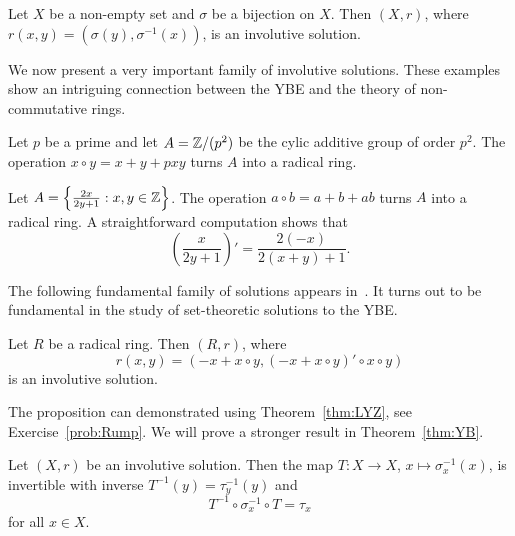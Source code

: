 \begin{example}
Let $X$ be a non-empty set and $\sigma$ be a bijection on $X$. Then 
$(X,r)$, where $r(x,y)=(\sigma(y),\sigma^{-1}(x))$, is an involutive solution. 
\end{example}

We now present a very important family of involutive solutions. 
These examples show an intriguing connection between the YBE and the 
theory of non-commutative rings. 




\begin{example}
Let $p$ be a prime and let $A=\mathbb{Z}/(p^2)$ be the cylic additive group of order $p^2$. 
The operation $x\circ y=x+y+pxy$ 
turns $A$ into a radical ring. 
\end{example}

\begin{example}
Let $A=\left\{\frac{2x}{2y+1}:x,y\in\mathbb{Z}\right\}$. The operation 
$a\circ b=a+b+ab$ turns $A$ into a radical ring. A straightforward computation shows that 
\[
\left(\frac{x}{2y+1}\right)'=\frac{2(-x)}{2(x+y)+1}.
\]
\end{example}

The following fundamental family of solutions appears in~\cite{MR2278047}. 
It turns out to be fundamental in the study of 
set-theoretic solutions to the YBE. 

\begin{proposition}
\label{pro:Rump}
Let $R$ be a radical ring. Then $(R,r)$, where 
\[
r(x,y)=( -x+x\circ y,(-x+x\circ y)'\circ x\circ y)
\]
is an involutive solution.
\end{proposition}

The proposition can demonstrated using Theorem~\ref{thm:LYZ}, 
see Exercise~\ref{prob:Rump}. 
We will prove a stronger result in Theorem~\ref{thm:YB}. 

\begin{proposition}
\label{pro:T}
Let $(X,r)$ be an involutive solution. 
Then the map $T\colon X\to X$, $x\mapsto\sigma_x^{-1}(x)$, is 
invertible with inverse $T^{-1}(y)=\tau^{-1}_y(y)$ and 
\[
T^{-1}\circ\sigma_x^{-1}\circ T=\tau_x
\]
for all $x\in X$. 
\end{proposition}


